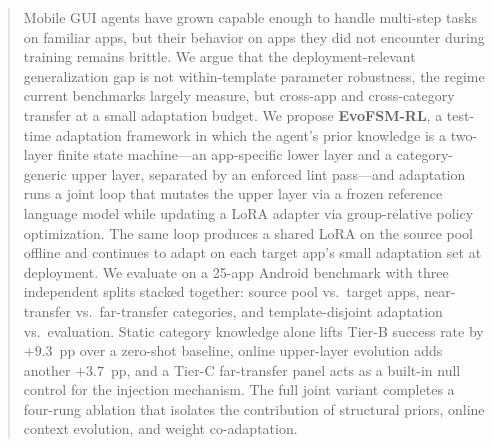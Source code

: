 \begin{abstract}
Mobile GUI agents have grown capable enough to handle multi-step tasks on familiar apps, but their behavior on apps they did not encounter during training remains brittle. We argue that the deployment-relevant generalization gap is not within-template parameter robustness, the regime current benchmarks largely measure, but cross-app and cross-category transfer at a small adaptation budget. We propose \textbf{EvoFSM-RL}, a test-time adaptation framework in which the agent's prior knowledge is a two-layer finite state machine---an app-specific lower layer and a category-generic upper layer, separated by an enforced lint pass---and adaptation runs a joint loop that mutates the upper layer via a frozen reference language model while updating a LoRA adapter via group-relative policy optimization. The same loop produces a shared LoRA on the source pool offline and continues to adapt on each target app's small adaptation set at deployment. We evaluate on a 25-app Android benchmark with three independent splits stacked together: source pool vs.\ target apps, near-transfer vs.\ far-transfer categories, and template-disjoint adaptation vs.\ evaluation. Static category knowledge alone lifts Tier-B success rate by $+9.3$~pp over a zero-shot baseline, online upper-layer evolution adds another $+3.7$~pp, and a Tier-C far-transfer panel acts as a built-in null control for the injection mechanism. The full joint variant completes a four-rung ablation that isolates the contribution of structural priors, online context evolution, and weight co-adaptation.
\end{abstract}

